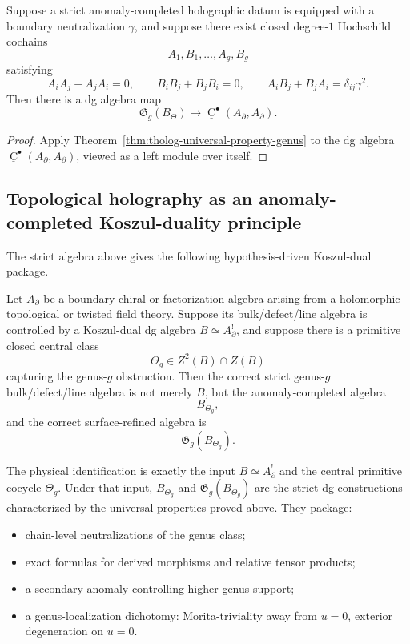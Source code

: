 \begin{corollary}
\label{cor:tholog-surface-completed-holographic-lift}
Suppose a strict anomaly-completed holographic datum is equipped with a boundary neutralization \(\gamma\), and suppose there exist closed degree-\(1\) Hochschild cochains
\[
A_{1},B_{1},\dots,A_{g},B_{g}
\]
satisfying
\[
A_{i}A_{j}+A_{j}A_{i}=0,\qquad
B_{i}B_{j}+B_{j}B_{i}=0,\qquad
A_{i}B_{j}+B_{j}A_{i}=\delta_{ij}\gamma^{2}.
\]
Then there is a dg algebra map
\[
\mathfrak{G}_{g}(B_{\Theta})
\longrightarrow
\underline{\operatorname{C}}^{\bullet}(A_{\partial},A_{\partial}).
\]
\end{corollary}

\begin{proof}
Apply Theorem~\ref{thm:tholog-universal-property-genus} to the dg algebra
\(\underline{\operatorname{C}}^{\bullet}(A_{\partial},A_{\partial})\),
viewed as a left module over itself.
\end{proof}

\subsection{Topological holography as an anomaly-completed Koszul-duality principle}
\label{subsec:tholog-koszul-duality-principle}

The strict algebra above gives the following hypothesis-driven
Koszul-dual package.

\begin{principle}
\label{prin:tholog-anomaly-completed-topological-holography}
Let \(A_{\partial}\) be a boundary chiral or factorization algebra arising from a holomorphic-topological or twisted field theory.
Suppose its bulk/defect/line algebra is controlled by a Koszul-dual dg algebra \(B\simeq A_{\partial}^{!}\), and suppose there is a primitive closed central class
\[
\Theta_{g}\in Z^{2}(B)\cap Z(B)
\]
capturing the genus-\(g\) obstruction.
Then the correct strict genus-\(g\) bulk/defect/line algebra is not merely \(B\), but the anomaly-completed algebra
\[
B_{\Theta_{g}},
\]
and the correct surface-refined algebra is
\[
\mathfrak{G}_{g}(B_{\Theta_{g}}).
\]
\end{principle}

The physical identification is exactly the input \(B\simeq A_\partial^!\)
and the central primitive cocycle \(\Theta_g\).  Under that input,
\(B_{\Theta_{g}}\) and \(\mathfrak{G}_{g}(B_{\Theta_{g}})\) are the
strict dg constructions characterized by the universal properties
proved above.
They package:
\begin{itemize}
\item chain-level neutralizations of the genus class;
\item exact formulas for derived morphisms and relative tensor products;
\item a secondary anomaly controlling higher-genus support;
\item a genus-localization dichotomy: Morita-triviality away from \(u=0\), exterior degeneration on \(u=0\).
\end{itemize}

